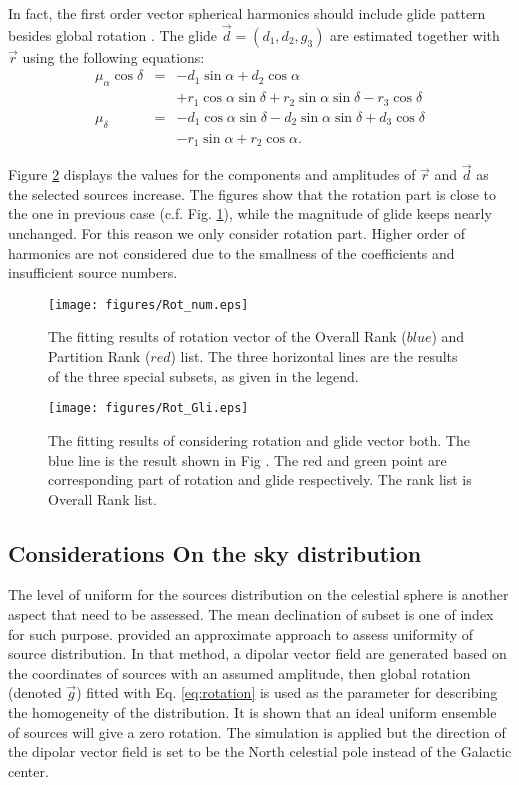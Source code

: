 \documentclass{aa}
\begin{document}
In fact, the first order vector spherical harmonics should include glide pattern besides global rotation \citep{Mignard2012}. The glide $\vec{d}=(d_1,d_2,g_3)$ are estimated together with $\vec r$ using the following equations:
\begin{eqnarray}
      \mu_{\alpha}\cos\delta & =& -d_1\sin\alpha + d_2\cos\alpha    \nonumber                   \\
                         &   & +r_1\cos\alpha\sin\delta +r_2\sin\alpha\sin\delta -r_3\cos\delta \nonumber  \\
      \mu_{\delta}           & =& -d_1\cos\alpha\sin\delta -d_2\sin\alpha\sin\delta +d_3\cos\delta  \nonumber  \\					                     &   & -r_1\sin\alpha + r_2\cos\alpha.
   \end{eqnarray}

Figure \ref{Fig:Rot_Gli} displays the values for the components and amplitudes of $\vec r$ and $\vec d$ as the selected sources increase. The figures show that the rotation part is close to the one in previous case (c.f. Fig. \ref{Fig:rot_num}), while the magnitude of glide keeps nearly unchanged. For this reason we only consider rotation part. Higher order of harmonics are not considered due to the smallness of the coefficients and insufficient source numbers.

\begin{figure}
   \centering
   \texttt{[image: figures/Rot\_num.eps]}
      \caption{
      The fitting results of rotation vector of the Overall Rank ($blue$) and Partition Rank ($red$) list. The three horizontal lines are the results of the three special subsets, as given in the legend.
              }
         \label{Fig:rot_num}
\end{figure}

	\begin{figure}
   \centering
   \texttt{[image: figures/Rot\_Gli.eps]}
      \caption{
      The fitting results of considering rotation and glide vector both. The blue line is the result shown in Fig . The red and green point are corresponding part of rotation and glide respectively. The rank list is Overall Rank list.}
      \label{Fig:Rot_Gli}
   \end{figure}

\subsection{Considerations On the sky distribution}
The level of uniform for the sources distribution on the celestial sphere is another aspect that need to be assessed. The mean declination of subset is one of index for such purpose. \citep{Liu2012} provided an approximate approach to assess uniformity of source distribution. In that method, a dipolar vector field are generated based on the coordinates of sources with an assumed amplitude, then global rotation (denoted $\vec g$) fitted with Eq. \ref{eq:rotation} is used as the parameter for describing the homogeneity of the distribution. It is shown that an ideal uniform ensemble of sources will give a zero rotation. The simulation is applied but the direction of the dipolar vector field is set to be the North celestial pole instead of the Galactic center.
\end{document}
